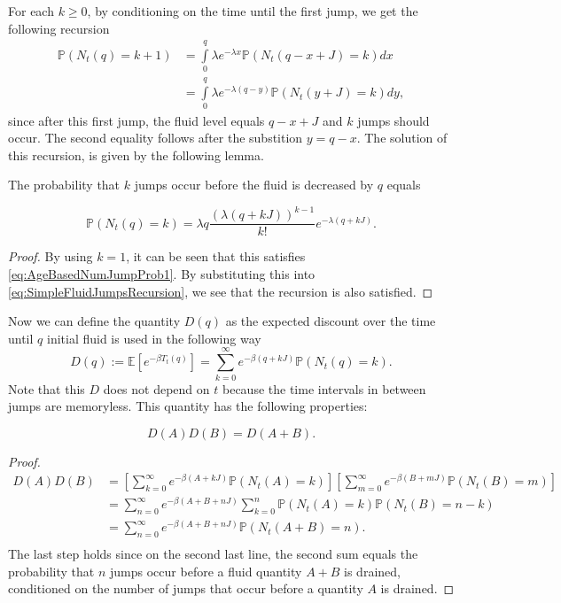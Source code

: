 For each $k\geq0$, by conditioning on the time until the first jump, we get the following recursion
\begin{equation}\label{eq:SimpleFluidJumpsRecursion}
\begin{split}
\mathbb{P}(N_t(q)=k+1)&=\int\limits_0^{q}\lambda e^{-\lambda x}\mathbb{P}(N_t(q-x+J)=k)dx\\
&=\int\limits_0^{q}\lambda e^{-\lambda (q-y)}\mathbb{P}(N_t(y+J)=k)dy,
\end{split}
\end{equation}
since after this first jump, the fluid level equals $q-x+J$ and $k$ jumps should occur. The second equality follows after the substition $y=q-x$.
The solution of this recursion, is given by the following lemma.
\begin{lemma}
	The probability that $k$ jumps occur before the fluid is decreased by $q$ equals
	
	\[\mathbb{P}(N_t(q)=k)=\lambda q\frac{(\lambda (q+kJ))^{k-1}}{k!}e^{-\lambda(q+kJ)}.\]
	
	\begin{proof}
		By using $k=1$, it can be seen that this satisfies \eqref{eq:AgeBasedNumJumpProb1}.
		By substituting this into \eqref{eq:SimpleFluidJumpsRecursion}, we see that the recursion is also satisfied.
	\end{proof}
\end{lemma}

Now we can define the quantity $D(q)$ as the expected discount over the time until $q$ initial fluid is used in the following way
\begin{equation}\label{eq:SimpleFluidDiscountDefinition}
D(q):=\mathbb{E}[e^{-\beta T_t(q)}]=\sum\limits_{k=0}^\infty e^{-\beta(q+kJ)}\mathbb{P}(N_t(q)=k).
\end{equation}
Note that this $D$ does not depend on $t$ because the time intervals in between jumps are memoryless.
This quantity has the following properties:
\begin{lemma}\label{lemma:SimpleFluidDiscountLogLinear}
	\[D(A)D(B)=D(A+B).\]
	\begin{proof}
		\begin{equation}
		\begin{split}
		D(A)D(B)&=\left[\sum\limits_{k=0}^\infty e^{-\beta(A+kJ)}\mathbb{P}(N_t(A)=k)\right]\left[\sum\limits_{m=0}^\infty e^{-\beta(B+mJ)}\mathbb{P}(N_t(B)=m)\right]\\
		&=\sum\limits_{n=0}^\infty e^{-\beta(A+B+nJ)}\sum\limits_{k=0}^n \mathbb{P}(N_t(A)=k)\mathbb{P}(N_t(B)=n-k)\\
		&=\sum\limits_{n=0}^\infty e^{-\beta(A+B+nJ)} \mathbb{P}(N_t(A+B)=n).\\
		\end{split}
		\end{equation}
		The last step holds since on the second last line, the second sum equals the probability that $n$ jumps occur before a fluid quantity $A+B$ is drained, conditioned on the number of jumps that occur before a quantity $A$ is drained.
	\end{proof}
\end{lemma}

